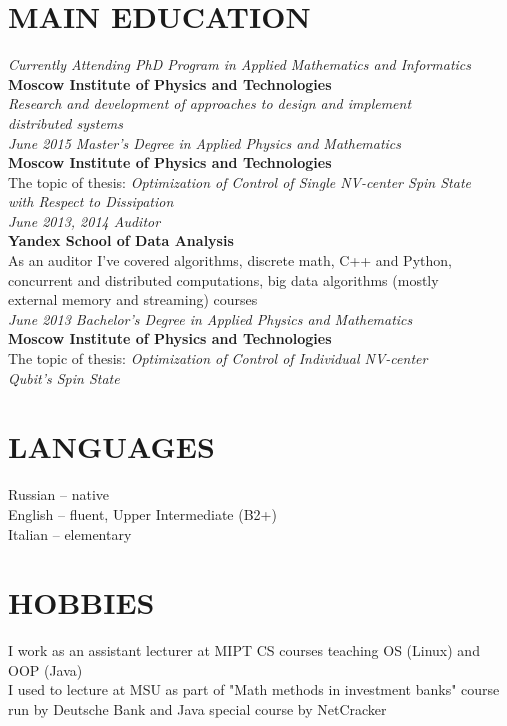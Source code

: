 \documentclass[margin,12pt]{res}
\begin{document}
\begin{resume}
\section{MAIN EDUCATION}
\textit{Currently Attending PhD Program in Applied Mathematics and Informatics\\}
\textbf{Moscow Institute of Physics and Technologies}\\
\textit{Research and development of approaches to design and implement\\
 distributed systems}\\
\newline
\textit{June 2015 Master's Degree in Applied Physics and Mathematics\\}
\textbf{Moscow Institute of Physics and Technologies}\\
The topic of thesis: \textit{Optimization of Control of Single NV-center Spin State \\
with Respect to Dissipation}\\
\newline
\textit{June 2013, 2014 Auditor\\}
\textbf{Yandex School of Data Analysis}\\
As an auditor I've covered algorithms, discrete math, C++ and Python,\\
concurrent and distributed computations, big data algorithms (mostly\\
external memory and streaming) courses\\
\newline
\newline
\textit{June 2013 Bachelor's Degree in Applied Physics and Mathematics\\}
\textbf{Moscow Institute of Physics and Technologies}\\
The topic of thesis: \textit{Optimization of Control of Individual NV-center\\ 
Qubit's Spin State}

\section{LANGUAGES}
Russian -- native\\
English -- fluent, Upper Intermediate (B2+)\\
Italian -- elementary

\section{HOBBIES}
I work as an assistant lecturer at MIPT CS courses teaching OS (Linux) and\\
 OOP (Java)\\
I used to lecture at MSU as part of "Math methods in investment banks" course\\
run by Deutsche Bank and Java special course by NetCracker

\end{resume}
\end{document}
